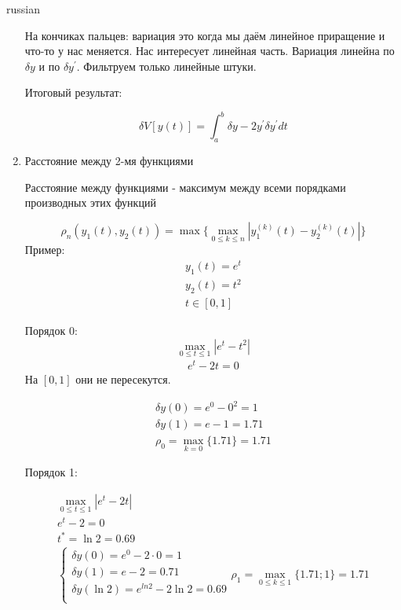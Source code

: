 \documentclass{article}
\begin{document}
\begin{otherlanguage*}{russian}
\begin{enumerate}
На кончиках пальцев: вариация это когда мы даём линейное приращение и что-то у нас меняется. Нас интересует линейная часть. Вариация линейна по $ \delta y $ и по $ \delta y^{'}$. Фильтруем только линейные штуки. 

Итоговый результат: 

\begin{equation}
\delta V[y(t)] = \int_a^b \delta y - 2 y^{'} \delta y^{'} dt
\end{equation}
\item Расстояние между 2-мя функциями 

Расстояние между функциями - максимум между всеми порядками производных этих функций

\begin{equation}
\rho_n (y_1 (t) , y_2(t)) = \max \{ \max_{0 \le k \le n} | y_1^{(k)}(t) - y_2^{(k)} (t) | \} 
\end{equation}
Пример: 
\begin{align}
y_1(t) = e^t  \\
y_2(t) = t ^ 2 \\
t \in [0, 1]  
\end{align}

Порядок 0: 
\begin{equation}
\max_{0 \le t \le 1} | e^ t - t ^ 2 |
\end{equation}
\begin{align}
e^t - 2t = 0 
\end{align}
На $[0,1 ] $ они не пересекутся. 

\begin{align}
\delta y (0 ) = e^0 - 0 ^ 2 = 1 \\
\delta y (1) = e - 1 = 1.71 \\ 
\rho_0 = \max_{k = 0} \{  1.71 \} = 1.71
\end{align}

Порядок 1: 

\begin{align}
\max_{0 \le t \le 1} |e^t - 2t| \\
e^t - 2 = 0 \\
t^* = \ln 2 = 0.69 \\
\begin{cases}
\delta y(0) = e^ 0 - 2 \cdot 0 = 1 \\
\delta y(1) = e - 2 = 0.71 \\
\delta y(\ln 2) = e^{ln 2} - 2 \ln 2 = 0.69 \\
\end{cases}
\rho_1 = \max_{0 \le k \le 1} \{ 1.71;1 \} = 1.71 
\end{align}


\end{enumerate}
\end{otherlanguage*}
\end{document}
